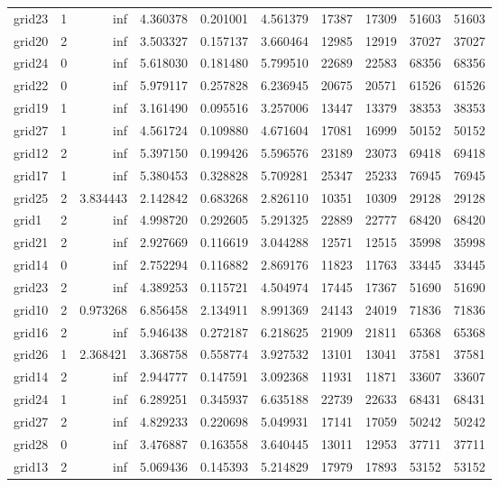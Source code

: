\begin{longtable}{|l|r|r|r|r|r|r|r|r|r|}
grid23 & 1 & inf & 4.360378 & 0.201001 & 4.561379 & 17387 & 17309 & 51603 & 51603 \\
grid20 & 2 & inf & 3.503327 & 0.157137 & 3.660464 & 12985 & 12919 & 37027 & 37027 \\
grid24 & 0 & inf & 5.618030 & 0.181480 & 5.799510 & 22689 & 22583 & 68356 & 68356 \\
grid22 & 0 & inf & 5.979117 & 0.257828 & 6.236945 & 20675 & 20571 & 61526 & 61526 \\
grid19 & 1 & inf & 3.161490 & 0.095516 & 3.257006 & 13447 & 13379 & 38353 & 38353 \\
grid27 & 1 & inf & 4.561724 & 0.109880 & 4.671604 & 17081 & 16999 & 50152 & 50152 \\
grid12 & 2 & inf & 5.397150 & 0.199426 & 5.596576 & 23189 & 23073 & 69418 & 69418 \\
grid17 & 1 & inf & 5.380453 & 0.328828 & 5.709281 & 25347 & 25233 & 76945 & 76945 \\
grid25 & 2 & 3.834443 & 2.142842 & 0.683268 & 2.826110 & 10351 & 10309 & 29128 & 29128 \\
grid1 & 2 & inf & 4.998720 & 0.292605 & 5.291325 & 22889 & 22777 & 68420 & 68420 \\
grid21 & 2 & inf & 2.927669 & 0.116619 & 3.044288 & 12571 & 12515 & 35998 & 35998 \\
grid14 & 0 & inf & 2.752294 & 0.116882 & 2.869176 & 11823 & 11763 & 33445 & 33445 \\
grid23 & 2 & inf & 4.389253 & 0.115721 & 4.504974 & 17445 & 17367 & 51690 & 51690 \\
grid10 & 2 & 0.973268 & 6.856458 & 2.134911 & 8.991369 & 24143 & 24019 & 71836 & 71836 \\
grid16 & 2 & inf & 5.946438 & 0.272187 & 6.218625 & 21909 & 21811 & 65368 & 65368 \\
grid26 & 1 & 2.368421 & 3.368758 & 0.558774 & 3.927532 & 13101 & 13041 & 37581 & 37581 \\
grid14 & 2 & inf & 2.944777 & 0.147591 & 3.092368 & 11931 & 11871 & 33607 & 33607 \\
grid24 & 1 & inf & 6.289251 & 0.345937 & 6.635188 & 22739 & 22633 & 68431 & 68431 \\
grid27 & 2 & inf & 4.829233 & 0.220698 & 5.049931 & 17141 & 17059 & 50242 & 50242 \\
grid28 & 0 & inf & 3.476887 & 0.163558 & 3.640445 & 13011 & 12953 & 37711 & 37711 \\
grid13 & 2 & inf & 5.069436 & 0.145393 & 5.214829 & 17979 & 17893 & 53152 & 53152 \\

\end{longtable}

